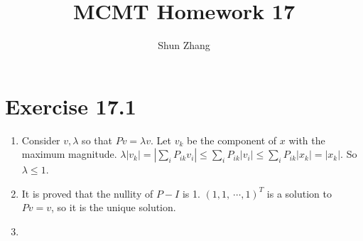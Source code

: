 \documentclass[10pt]{article}
\title{MCMT Homework 17}
\author{Shun Zhang}
\date{}
\begin{document}
\maketitle

\section*{Exercise 17.1}

\begin{enumerate}
\item Consider $v, \lambda$ so that $Pv = \lambda v$.
Let $v_k$ be the component of $x$ with the maximum magnitude.
$\lambda |v_k| = |\sum_i P_{ik} v_i| \leq \sum_i P_{ik} |v_i| \leq \sum_i P_{ik}
|x_k| = |x_k|$.
So $\lambda \leq 1$.

\item It is proved that the nullity of $P - I$ is 1. $(1,1,\
\cdots,1)^T$ is a solution to $Pv = v$, so it is the unique solution.

\item 

\end{enumerate}
\end{document}
